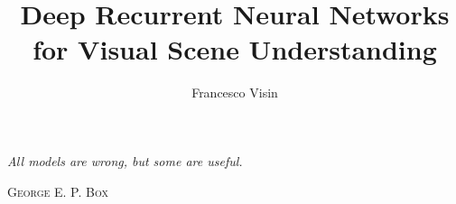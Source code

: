 \documentclass[10pt,twoside,openright,english,italian]{book}%
\author{Francesco Visin}
\title{Deep Recurrent Neural Networks for Visual Scene Understanding}
\let\originalepigraph\epigraph
\renewcommand\epigraph[2]{\originalepigraph{\textit{#1}}{\textsc{#2}}}
\begin{document}

\maketitle

\pagestyle{empty}

\cleardoublepage
\newpage

\setlength{\epigraphwidth}{0.4\textwidth}
\epigraph{All models are wrong, but some are useful.}{George E. P. Box}
\clearpage

%

\cleardoublepage
\newpage

\pagestyle{fancy}
\setcounter{page}{1}





\tableofcontents
\cleardoublepage
\newpage

\setcounter{page}{1}

\cleardoublepage








\cleardoublepage
{}
{}
\small

%

\end{document}
